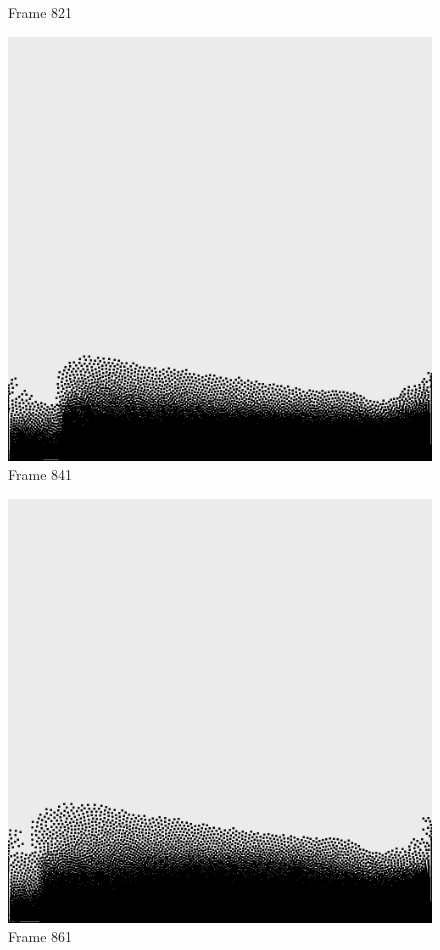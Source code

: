 \documentclass[a4paper, 12pt, oneside]{book}
\begin{document}
\begin{figure}[!ht]
\begin{center}
            Frame 821
        \end{center}
    \endminipage
    \hfill
        \begin{center}
            \includegraphics[width=\linewidth]{images/test_case_2/841.png}
            Frame 841
        \end{center}
    \endminipage
    \hfill
        \begin{center}
            \includegraphics[width=\linewidth]{images/test_case_2/861.png}
            Frame 861
        \end{center}
    \endminipage
    \hfill


\end{figure}
\end{document}
